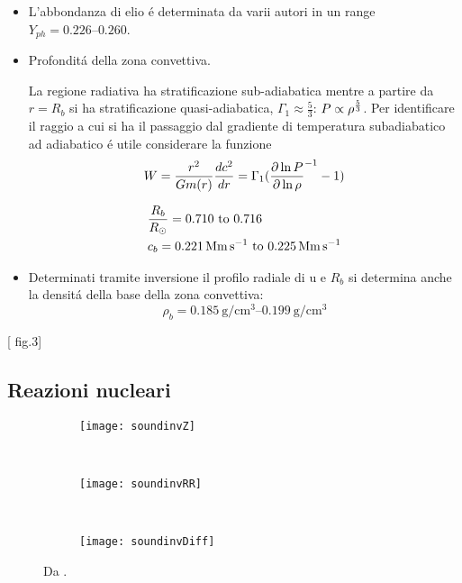 \documentclass[../main.tex]{subfiles}
\begin{document}
\begin{itemize}

\item L'abbondanza di elio \'e determinata da varii autori in un range $Y_{ph}=\numrange{0.226}{0.260}$.
    
\item Profondit\'a della zona convettiva.

La regione radiativa ha stratificazione sub-adiabatica mentre a partire da $r=R_b$ si ha stratificazione quasi-adiabatica,  $\Gamma_1\approx\frac{5}{3}$: $P\propto\rho\expy{\frac{5}{3}}$. Per identificare il raggio a cui si ha il passaggio dal gradiente di temperatura subadiabatico ad adiabatico \'e utile considerare la funzione
\begin{equation}
W=\frac{r^2}{Gm(r)}\TDy{r}{c^2}=\Gamma_1(\invers{\PDly{\rho}{P}}-1)
\end{equation}

    
\begin{align*}
&\frac{R_b}{\rsun{}}=\numrange{0.710}{0.716}\\
&c_b=\SIrange{0.221}{0.225}{\mega\meter\per\second}
\end{align*}

\item Determinati tramite inversione il profilo radiale di u e $R_b$ si determina anche la densit\'a della base della zona convettiva:
\begin{equation*}
\rho_b=\SIrange{0.185}{0.199}{\gram\per\cubic\cm}
\end{equation*}
    
\end{itemize}

[\cite{deg97helioseismology} fig.3]


\subsection{Reazioni nucleari}


\begin{figure}[!h]
\centering

\begin{subfigure}[t]{0.32\textwidth}
\texttt{[image: soundinvZ]}
\end{subfigure}
~
\begin{subfigure}[t]{0.32\textwidth}
\texttt{[image: soundinvRR]}
\end{subfigure}
~
\begin{subfigure}[t]{0.32\textwidth}
\texttt{[image: soundinvDiff]}
\end{subfigure}
\caption{Da \cite{boothroyd2003our}.}

\end{figure}
\end{document}
